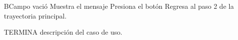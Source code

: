 			
		\begin{UCtrayectoriaA}{B}{Campo vació}
			\UCpaso[\UCsist] Muestra el mensaje 
			\UCpaso[\UCactor] Presiona el botón 
			\UCpaso[\UCsist] Regresa al paso 2 de la trayectoria principal.
		\end{UCtrayectoriaA}

		
		
TERMINA descripción del caso de uso.


